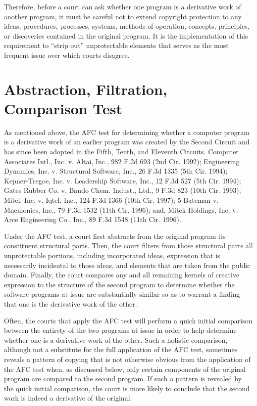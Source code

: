 \documentclass[11pt, letterpaper]{book}
\begin{document}
Therefore, before a court can ask whether one program is a derivative work
of another program, it must be careful not to extend copyright protection
to any ideas, procedures, processes, systems, methods of operation,
concepts, principles, or discoveries contained in the original program. It
is the implementation of this requirement to ``strip out'' unprotectable
elements that serves as the most frequent issue over which courts
disagree.

\section{Abstraction, Filtration, Comparison Test}

As mentioned above, the AFC test for determining whether a computer
program is a derivative work of an earlier program was created by the
Second Circuit and has since been adopted in the Fifth, Tenth, and
Eleventh Circuits. Computer Associates Intl., Inc. v. Altai, Inc., 982
F.2d 693 (2nd Cir. 1992); Engineering Dynamics, Inc. v. Structural
Software, Inc., 26 F.3d 1335 (5th Cir. 1994); Kepner-Tregoe,
Inc. v. Leadership Software, Inc., 12 F.3d 527 (5th Cir. 1994); Gates
Rubber Co. v. Bando Chem. Indust., Ltd., 9 F.3d 823 (10th Cir. 1993);
Mitel, Inc. v. Iqtel, Inc., 124 F.3d 1366 (10th Cir. 1997); 5 Bateman
v. Mnemonics, Inc., 79 F.3d 1532 (11th Cir. 1996); and, Mitek Holdings,
Inc. v. Arce Engineering Co., Inc., 89 F.3d 1548 (11th Cir. 1996).

Under the AFC test, a court first abstracts from the original program its
constituent structural parts. Then, the court filters from those
structural parts all unprotectable portions, including incorporated ideas,
expression that is necessarily incidental to those ideas, and elements
that are taken from the public domain. Finally, the court compares any and
all remaining kernels of creative expression to the structure of the
second program to determine whether the software programs at issue are
substantially similar so as to warrant a finding that one is the
derivative work of the other.

Often, the courts that apply the AFC test will perform a quick initial
comparison between the entirety of the two programs at issue in order to
help determine whether one is a derivative work of the other. Such a
holistic comparison, although not a substitute for the full application of
the AFC test, sometimes reveals a pattern of copying that is not otherwise
obvious from the application of the AFC test when, as discussed below,
only certain components of the original program are compared to the second
program. If such a pattern is revealed by the quick initial comparison,
the court is more likely to conclude that the second work is indeed a
derivative of the original.
\end{document}
